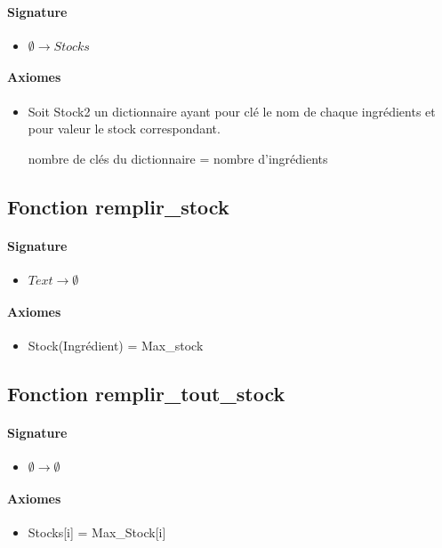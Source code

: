 \documentclass[]{article}
\begin{document}
\paragraph{Signature}
\begin{itemize}
\item
  $  \emptyset \longrightarrow Stocks$
\end{itemize}
\paragraph{Axiomes}
\begin{itemize}
\item
  Soit Stock2 un dictionnaire ayant pour clé le nom de chaque
  ingrédients et pour valeur le stock correspondant.

nombre de clés du dictionnaire = nombre d'ingrédients
\end{itemize}

\subsection*{Fonction remplir\_stock}
\paragraph{Signature}
\begin{itemize}
\item
  $  Text \longrightarrow \emptyset$
\end{itemize}
\paragraph{Axiomes}
\begin{itemize}
\item
Stock(Ingrédient) = Max\_stock
\end{itemize}

\subsection*{Fonction remplir\_tout\_stock}
\paragraph{Signature}
\begin{itemize}
\item
  $  \emptyset \longrightarrow \emptyset$
\end{itemize}
\paragraph{Axiomes}
\begin{itemize}
\item
Stocks{[}i{]} = Max\_Stock{[}i{]}
\end{itemize}
\end{document}
